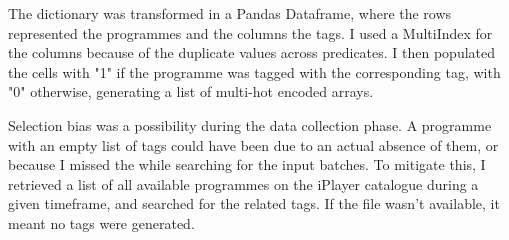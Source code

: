 The dictionary was transformed in a Pandas Dataframe, where the rows represented the programmes and the columns the tags.
I used a MultiIndex \cite{Pandas:MultiIndex} for the columns because of the duplicate values across predicates.
I then populated the cells with "1" if the programme was tagged with the corresponding tag, with "0" otherwise, generating a
list of multi-hot encoded arrays.

Selection bias was a possibility during the data collection phase. A programme with an empty list of tags could have been due to
an actual absence of them, or because I missed the while searching for the input batches. To mitigate this, I retrieved a list
of all available programmes on the iPlayer catalogue during a given timeframe, and searched for the related tags.
If the file wasn't available, it meant no tags were generated.
